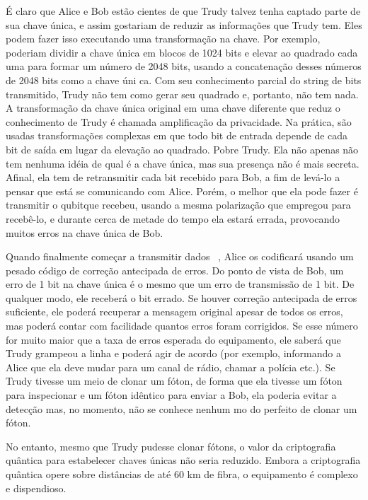 É claro que Alice e Bob estão cientes de que Trudy talvez tenha captado parte de sua chave única, e assim gostariam de reduzir as informações que Trudy tem. Eles podem fazer isso executando uma transformação na chave. Por exemplo, poderiam dividir a chave única em blocos de 1024 bits e elevar ao quadrado cada uma para formar um número de 2048 bits, usando a concatenação desses números de 2048 bits como a chave úni ca. Com seu conhecimento parcial do string de bits transmitido, Trudy não tem como gerar seu quadrado e, portanto, não tem nada. A transformação da chave única original em uma chave diferente que reduz o conhecimento de Trudy é chamada amplificação da privacidade. Na prática, são usadas transformações complexas em que todo bit de entrada depende de cada bit de saída em lugar da elevação ao quadrado.
Pobre Trudy. Ela não apenas não tem nenhuma idéia de qual é a chave única, mas sua presença
não é mais secreta. Afinal, ela tem de retransmitir cada bit recebido para Bob, a fim de levá-lo a pensar que está se comunicando com Alice. Porém, o melhor que ela pode fazer é transmitir o qubitque recebeu, usando a mesma polarização que empregou para recebê-lo, e durante cerca de
metade do tempo ela estará errada, provocando muitos erros na chave única de Bob.

Quando finalmente começar a transmitir dados ~\cite{tanenbaum}, Alice os codificará usando um pesado código de
correção antecipada de erros. Do ponto de vista de Bob, um erro de 1 bit na chave única é o
mesmo que um erro de transmissão de 1 bit. De qualquer modo, ele receberá o bit errado. Se
houver correção antecipada de erros suficiente, ele poderá recuperar a mensagem original apesar de todos os erros, mas poderá contar com facilidade quantos erros foram corrigidos. Se esse número for muito maior que a taxa de erros esperada do equipamento, ele saberá que Trudy
grampeou a linha e poderá agir de acordo (por exemplo, informando a Alice que ela deve mudar
para um canal de rádio, chamar a polícia etc.). Se Trudy tivesse um meio de clonar um fóton, de forma que ela tivesse um fóton para inspecionar e um fóton idêntico para enviar a Bob, ela poderia evitar a detecção mas, no momento, não se conhece nenhum mo do perfeito de clonar um fóton.

No entanto, mesmo que Trudy pudesse clonar fótons, o valor da criptografia quântica para
estabelecer chaves únicas não seria reduzido. Embora a criptografia quântica opere sobre distâncias de até 60 km de fibra, o equipamento é complexo e dispendioso.

